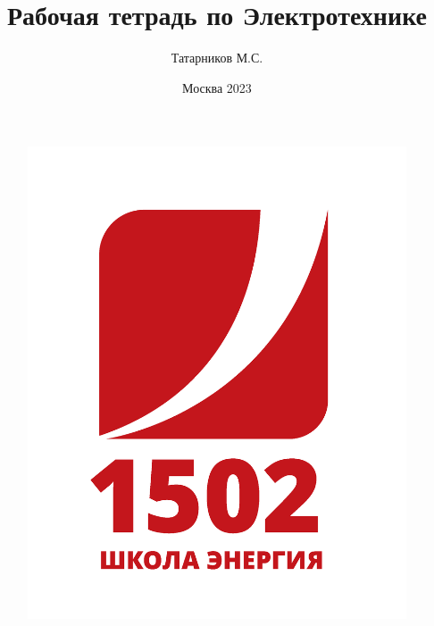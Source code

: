 \documentclass[a4paper, 10pt]{article}
\title{Рабочая тетрадь по Электротехнике}
\author{Татарников М.С.}
\date{Москва 2023}
\begin{document}
\begin{figure}
    \includegraphics[width=0.3\linewidth]{картинки/1502_Logo-01.png}
\end{figure}


\maketitle
\thispagestyle{empty}

 \newpage

 \tableofcontents
 \newpage
\onehalfspacing
\newpage


















\end{document}
